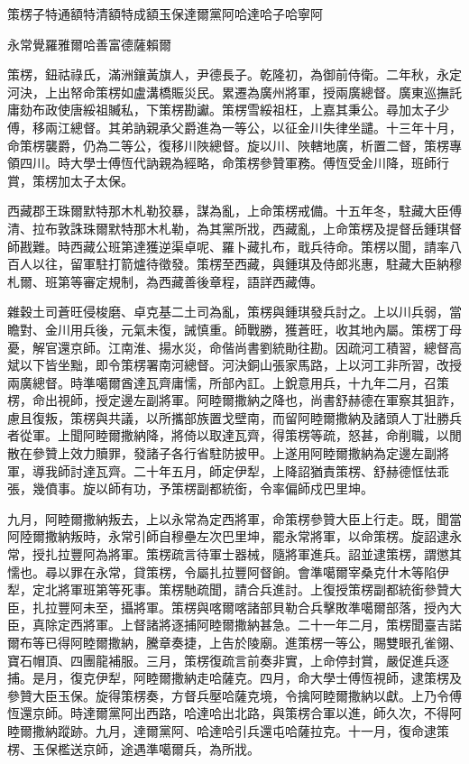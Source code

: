 
\begin{pinyinscope}
策楞子特通額特清額特成額玉保達爾黨阿哈達哈子哈寧阿

永常覺羅雅爾哈善富德薩賴爾

策楞，鈕祜祿氏，滿洲鑲黃旗人，尹德長子。乾隆初，為御前侍衛。二年秋，永定河決，上出帑命策楞如盧溝橋賑災民。累遷為廣州將軍，授兩廣總督。廣東巡撫託庸劾布政使唐綏祖贓私，下策楞勘讞。策楞雪綏祖枉，上嘉其秉公。尋加太子少傅，移兩江總督。其弟訥親承父爵進為一等公，以征金川失律坐譴。十三年十月，命策楞襲爵，仍為二等公，復移川陜總督。旋以川、陜轄地廣，析置二督，策楞專領四川。時大學士傅恆代訥親為經略，命策楞參贊軍務。傅恆受金川降，班師行賞，策楞加太子太保。

西藏郡王珠爾默特那木札勒狡暴，謀為亂，上命策楞戒備。十五年冬，駐藏大臣傅清、拉布敦誅珠爾默特那木札勒，為其黨所戕，西藏亂，上命策楞及提督岳鍾琪督師戡難。時西藏公班第達獲逆渠卓呢、羅卜藏扎布，戢兵待命。策楞以聞，請率八百人以往，留軍駐打箭爐待徵發。策楞至西藏，與鍾琪及侍郎兆惠，駐藏大臣納穆札爾、班第等審定規制，為西藏善後章程，語詳西藏傳。

雜穀土司蒼旺侵梭磨、卓克基二土司為亂，策楞與鍾琪發兵討之。上以川兵弱，當瞻對、金川用兵後，元氣未復，誡慎重。師戰勝，獲蒼旺，收其地內屬。策楞丁母憂，解官還京師。江南淮、揚水災，命偕尚書劉統勛往勘。因疏河工積習，總督高斌以下皆坐黜，即令策楞署南河總督。河決銅山張家馬路，上以河工非所習，改授兩廣總督。時準噶爾酋達瓦齊庸懦，所部內訌。上銳意用兵，十九年二月，召策楞，命出視師，授定邊左副將軍。阿睦爾撒納之降也，尚書舒赫德在軍察其狙詐，慮且復叛，策楞與共議，以所攜部族置戈壁南，而留阿睦爾撒納及諸頭人丁壯勝兵者從軍。上聞阿睦爾撒納降，將倚以取達瓦齊，得策楞等疏，怒甚，命削職，以閒散在參贊上效力贖罪，發諸子各行省駐防披甲。上遂用阿睦爾撒納為定邊左副將軍，導我師討達瓦齊。二十年五月，師定伊犁，上降詔猶責策楞、舒赫德恇怯乖張，幾僨事。旋以師有功，予策楞副都統銜，令率偏師戍巴里坤。

九月，阿睦爾撒納叛去，上以永常為定西將軍，命策楞參贊大臣上行走。既，聞當阿陸爾撒納叛時，永常引師自穆壘左次巴里坤，罷永常將軍，以命策楞。旋詔逮永常，授扎拉豐阿為將軍。策楞疏言待軍士器械，隨將軍進兵。詔並逮策楞，謂懲其懦也。尋以罪在永常，貸策楞，令屬扎拉豐阿督餉。會準噶爾宰桑克什木等陷伊犁，定北將軍班第等死事。策楞馳疏聞，請合兵進討。上復授策楞副都統銜參贊大臣，扎拉豐阿未至，攝將軍。策楞與喀爾喀諸部貝勒合兵擊敗準噶爾部落，授內大臣，真除定西將軍。上督諸將逐捕阿睦爾撒納甚急。二十一年二月，策楞聞臺吉諾爾布等已得阿睦爾撒納，騰章奏捷，上告於陵廟。進策楞一等公，賜雙眼孔雀翎、寶石帽頂、四團龍補服。三月，策楞復疏言前奏非實，上命停封賞，嚴促進兵逐捕。是月，復克伊犁，阿睦爾撒納走哈薩克。四月，命大學士傅恆視師，逮策楞及參贊大臣玉保。旋得策楞奏，方督兵壓哈薩克境，令擒阿睦爾撒納以獻。上乃令傅恆還京師。時達爾黨阿出西路，哈達哈出北路，與策楞合軍以進，師久次，不得阿睦爾撒納蹤跡。九月，達爾黨阿、哈達哈引兵還屯哈薩拉克。十一月，復命逮策楞、玉保檻送京師，途遇準噶爾兵，為所戕。


\end{pinyinscope}

